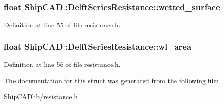 \hypertarget{structShipCAD_1_1DelftSeriesResistance_a7ee0a7e2d05634beb7fb9951d80c7557}{
\subsubsection[{wetted\-\_\-surface}]{\setlength{\rightskip}{0pt plus 5cm}float Ship\-C\-A\-D\-::\-Delft\-Series\-Resistance\-::wetted\-\_\-surface}}\label{structShipCAD_1_1DelftSeriesResistance_a7ee0a7e2d05634beb7fb9951d80c7557}


Definition at line 55 of file resistance.\-h.

\hypertarget{structShipCAD_1_1DelftSeriesResistance_af51e72b70af1ce87cf7ac641df93c541}{
\subsubsection[{wl\-\_\-area}]{\setlength{\rightskip}{0pt plus 5cm}float Ship\-C\-A\-D\-::\-Delft\-Series\-Resistance\-::wl\-\_\-area}}\label{structShipCAD_1_1DelftSeriesResistance_af51e72b70af1ce87cf7ac641df93c541}


Definition at line 56 of file resistance.\-h.



The documentation for this struct was generated from the following file\-:\begin{DoxyCompactItemize}
\item 
Ship\-C\-A\-Dlib/\hyperlink{resistance_8h}{resistance.\-h}\end{DoxyCompactItemize}

